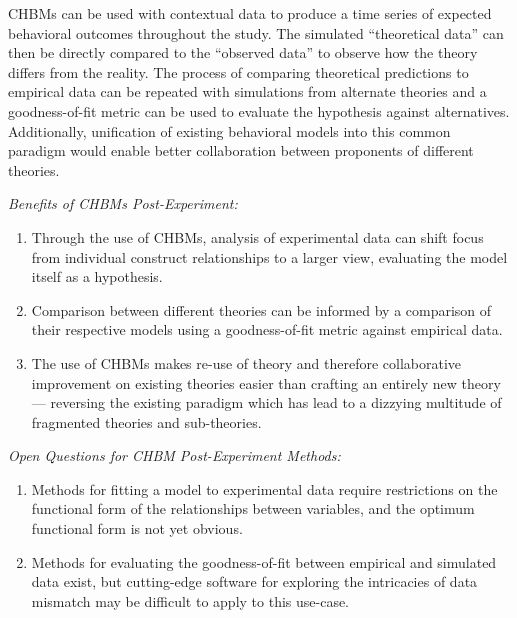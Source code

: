 \documentclass[runningheads,a4paper]{llncs}
\begin{document}
CHBMs can be used with contextual data to produce a time series of expected behavioral outcomes throughout the study.
The simulated ``theoretical data'' can then be directly compared to the ``observed data'' to observe how the theory differs from the reality.
The process of comparing theoretical predictions to empirical data can be repeated with simulations from alternate theories and a goodness-of-fit metric can be used to evaluate the hypothesis against alternatives.
Additionally, unification of existing behavioral models into this common paradigm would enable better collaboration between proponents of different theories.

\emph{Benefits of CHBMs Post-Experiment:}
\begin{enumerate}
    \item Through the use of CHBMs, analysis of experimental data can shift focus from individual construct relationships to a larger view, evaluating the model itself as a hypothesis.
    \item Comparison between different theories can be informed by a comparison of their respective models using a goodness-of-fit metric against empirical data.
    \item The use of CHBMs makes re-use of theory and therefore collaborative improvement on existing theories easier than crafting an entirely new theory --- reversing the existing paradigm which has lead to a dizzying multitude of fragmented theories and sub-theories.
\end{enumerate}

\emph{Open Questions for CHBM Post-Experiment Methods:}
\begin{enumerate}
    \item Methods for fitting a model to experimental data require restrictions on the functional form of the relationships between variables, and the optimum functional form is not yet obvious.
    \item Methods for evaluating the goodness-of-fit between empirical and simulated data exist, but cutting-edge software for exploring the intricacies of data mismatch may be difficult to apply to this use-case.
\end{enumerate}
\end{document}
